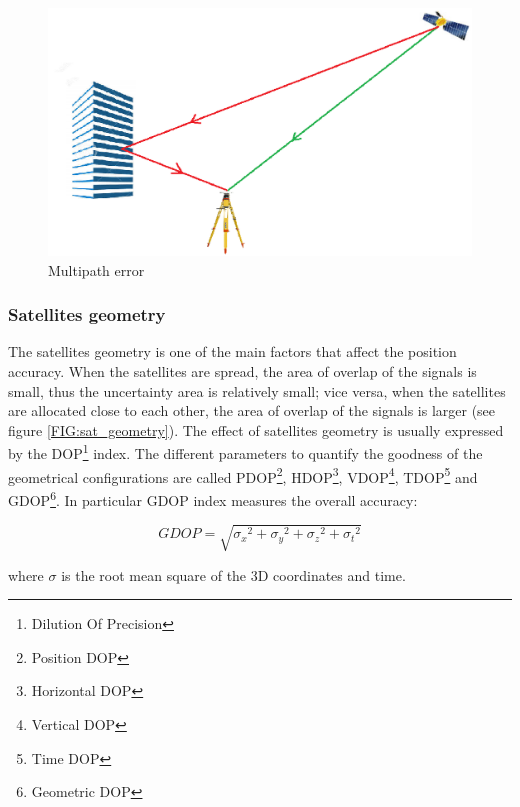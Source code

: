 \begin{figure}[ht] 
	\centering
	\includegraphics[scale=0.4]{fig/multipath_error.eps} 
	\caption{Multipath error}
	\label{FIG:multipath} 
\end{figure}


\subsubsection{Satellites geometry}

The satellites geometry is one of the main factors that affect the position accuracy. When the satellites are spread, the area of overlap of the signals is small, thus the uncertainty area is relatively small; vice versa, when the satellites are allocated close to each other, the area of overlap of the signals is larger (see figure \ref{FIG:sat_geometry}). The effect of satellites geometry is usually expressed by the DOP\footnote{Dilution Of Precision} index. The different parameters to quantify the goodness of the geometrical configurations are called PDOP\footnote{Position DOP}, HDOP\footnote{Horizontal DOP}, VDOP\footnote{Vertical DOP}, TDOP\footnote{Time DOP} and GDOP\footnote{Geometric DOP}. In particular GDOP index measures the overall accuracy:

\begin{equation}
	GDOP = \sqrt{{\sigma_{x}}^{2}+{\sigma_{y}}^{2}+{\sigma_{z}}^{2}+{\sigma_{t}}^{2}}
	\label{eq:GDOP}
\end{equation}

where $\sigma$ is the root mean square of the 3D coordinates and time.

